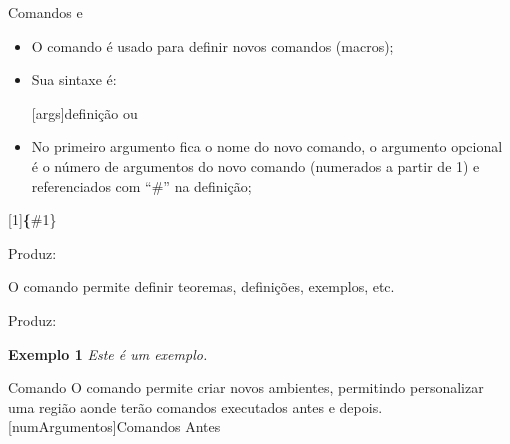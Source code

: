 
\begin{frame}{Comandos  e }
\begin{itemize}
\item O comando  é usado para definir novos comandos (macros);
\item Sua sintaxe é:
\begin{LaTeXcode}
[args]{definição}\n
ou\n
{}
\end{LaTeXcode}
\item No primeiro argumento fica o nome do novo comando, o argumento opcional é o número de argumentos do novo comando (numerados a partir de 1) e referenciados com ``\#'' na definição;
\end{itemize}
\end{frame}

\begin{frame}{}
\begin{LaTeXcode}[Exemplo]
[1]{\lb\string\Large \string\textbf\{\#1\}\rb}\n

\end{LaTeXcode}
Produz:
\begin{LaTeXoutput}
\end{LaTeXoutput}
\end{frame}

\begin{frame}{}
O comando  permite definir teoremas, definições, exemplos, etc.

Produz:
\begin{LaTeXoutput}
\textbf{Exemplo 1} \textit{Este é um exemplo.}
\end{LaTeXoutput}
\end{frame}

\begin{frame}{Comando }
O comando  permite criar novos ambientes, permitindo personalizar uma região aonde terão comandos executados antes e depois.
[numArgumentos]{Comandos Antes}

\end{frame}

